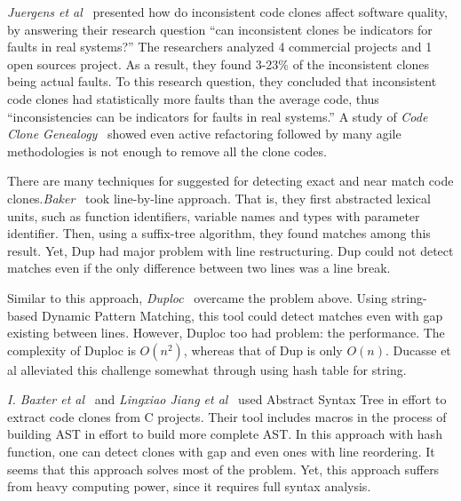 \documentclass[nocopyrightspace]{sigplanconf}
\begin{document}
\emph{Juergens et al}~\cite{Juergens2009} presented how do inconsistent code clones affect software quality, by answering their research question “can inconsistent clones be indicators for faults in real systems?” The researchers analyzed 4 commercial projects and 1 open sources project. As a result, they found 3-23\% of the inconsistent clones being actual faults. To this research question, they concluded that inconsistent code clones had statistically more faults than the average code, thus “inconsistencies can be indicators for faults in real systems.” A study of \emph{Code Clone Genealogy}~\cite{Kim2005} showed even active refactoring followed by many agile methodologies is not enough to remove all the clone codes.

There are many techniques for suggested for detecting exact and near match code clones.\emph{Baker}~\citep{Baker1995} took line-by-line approach. That is, they first abstracted lexical units, such as function identifiers, variable names and types with parameter identifier. Then, using a suffix-tree algorithm, they found matches among this result. Yet, Dup had major problem with line restructuring. Dup could not detect matches even if the only difference between two lines was a line break. 

Similar to this approach, \emph{Duploc}~\cite{Ducasse1999} overcame the problem above. Using string-based Dynamic Pattern Matching, this tool could detect matches even with gap existing between lines. However, Duploc too had problem: the performance. The complexity of Duploc is $O(n^2)$, whereas that of Dup is only $O(n)$. Ducasse et al alleviated this challenge somewhat through using hash table for string.

\emph{I. Baxter et al}~\cite{Baxter1998} and \emph{Lingxiao Jiang et al}~\cite{Jiang2007} used Abstract Syntax Tree in effort to extract code clones from C projects. Their tool includes macros in the process of building AST in effort to build more complete AST. In this approach with hash function, one can detect clones with gap and even ones with line reordering. It seems that this approach solves most of the problem. Yet, this approach suffers from heavy computing power, since it requires full syntax analysis.
\end{document}

